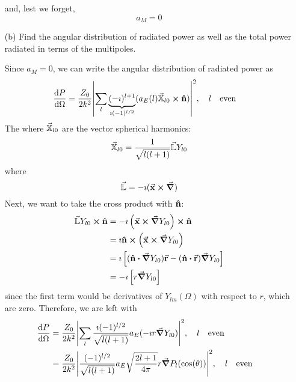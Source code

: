 \documentclass[a4paper,twoside]{article}
\begin{document}
\begin{itemize}
\begin{problem}
\begin{equation}
            \end{equation}
            and, lest we forget,
            \begin{equation}
                a_M = 0
            \end{equation}
        \end{problem}
    \item[(b)] Find the angular distribution of radiated power as well as the total power radiated in terms of the multipoles.
        \begin{problem}
            Since $ a_M = 0 $, we can write the angular distribution of radiated power as
            \begin{equation}
                \dv{P}{\Omega} = \frac{Z_0}{2 k^2} \abs{\sum_l \underbrace{(- \imath)^{l+1}}_{\imath (-1)^{l/2}} (a_E(l) \va{\mathbb{X}}_{l0} \cross \vu{n})}^2 \qc l \qeven
            \end{equation}
            The where $ \va{\mathbb{X}}_{l0} $ are the vector spherical harmonics:
            \begin{equation}
                \va{\mathbb{X}}_{l0} = \frac{1}{\sqrt{l(l+1)}} \va{\mathbb{L}} Y_{l0}
            \end{equation}
            where
            \begin{equation}
                \va{\mathbb{L}} = - \imath ( \va{x} \cross \grad)
            \end{equation}
            Next, we want to take the cross product with $ \vu{n} $:
            \begin{align}
                \va{\mathbb{L}} Y_{l0} \cross \vu{n} &= - \imath \left( \va{x} \cross \grad{Y_{l0}} \right) \cross \vu{n} \\
                &= \imath \vu{n} \cross \left( \va{x} \cross \grad{Y_{l0}} \right) \\
                &= \imath \left[ (\vu{n} \vdot \grad{Y_{l0}}) \va{r} - (\vu{n} \vdot \va{r}) \grad{Y_{l0}} \right] \\
                &= - \imath \left[ r \grad{Y_{l0}} \right]
            \end{align}
            since the first term would be derivatives of $ Y_{lm}(\Omega) $ with respect to $ r $, which are zero. Therefore, we are left with
            \begin{align}
                \dv{P}{\Omega} &= \frac{Z_0}{2 k^2} \abs{ \sum_l \frac{\imath(-1)^{l/2}}{\sqrt{l(l+1)}} a_E (- \imath r \grad{Y_{l0}})}^2 \qc l \qeven \\
                &= \frac{Z_0}{2 k^2} \abs{ \frac{(-1)^{l/2}}{\sqrt{l(l+1)}} a_E \sqrt{\frac{2l+1}{4 \pi}} r \grad{P_l(\cos(\theta))}}^2 \qc l \qeven\\

\end{align}
\end{problem}
\end{itemize}
\end{document}
